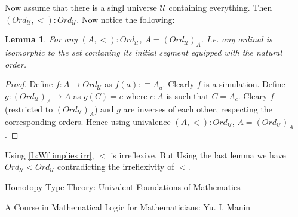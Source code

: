 \documentclass[11pt]{article}
\theoremstyle{definition}
\theoremstyle{plain}
\newtheorem{lemma}[definition]{Lemma}
\theoremstyle{remark}
\newcommand{\U}{\mathscr{U}}
\begin{document}
Now assume that there is a singl universe $\U$ containing everything. Then 
$(Ord_{\U},<) : Ord_{\U}$. Now notice the following:

\begin{lemma}\label{L:A<Ord}
For any $(A, <) : Ord_{\U}$, $A = (Ord_{\U})_A$. I.e. any ordinal is isomorphic to the
set contaning its initial segment equipped with the natural order.
\end{lemma}

\begin{proof}
Define $f : A \to Ord_{\U}$ as $f(a) :\equiv A_a$. Clearly $f$ is a simulation. Define
$g : (Ord_{\U})_A \to A$ as $g(C) = c$ where $c : A$ is such that $C = A_c$. Cleary $f$
(restricted to $(Ord_{\U})_A$) and $g$ are inverses of each other, respecting the 
corresponding orders. Hence using univalence $(A, <) : Ord_{\U}$, $A = (Ord_{\U})_A$.
\end{proof}

Using \ref{L:Wf implies irr}, $<$ is irreflexive. But Using the last lemma we have 
$Ord_{\U} < Ord_{\U}$ contradicting the irreflexivity of $<$.

\begin{thebibliography}{99}

Homotopy Type Theory: Univalent Foundations of Mathematics

A Course in Mathematical Logic for Mathematicians: Yu. I. Manin 

\end{thebibliography}
\end{document}
